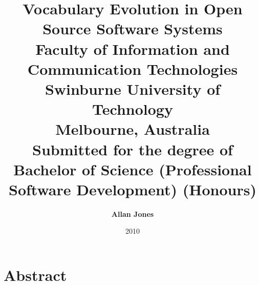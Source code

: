 \title{ \huge{\textbf{Vocabulary Evolution in Open Source Software Systems}} \\[1.2cm]
\large{Faculty of Information and Communication Technologies\\
Swinburne University of Technology\\
Melbourne, Australia\\}
\vspace{1.2cm} 
\large{Submitted for the degree of Bachelor of Science (Professional Software Development) (Honours)} \\
\vspace{1cm} 
} 
\author{ \Large{\textbf{Allan Jones}} } 
\date{2010} 
\maketitle

\newpage 
{}
\chapter*{Abstract}
\vspace{-0.75cm}


% 

